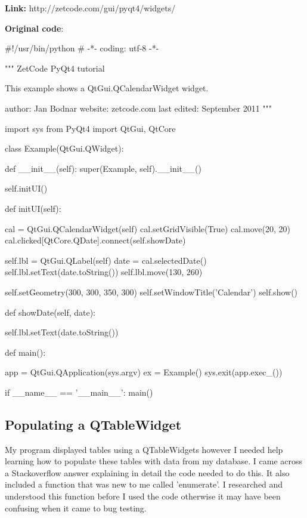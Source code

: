 \textbf{Link:} http://zetcode.com/gui/pyqt4/widgets/

\textbf{Original code}:

\begin{python}
#!/usr/bin/python
# -*- coding: utf-8 -*-

"""
ZetCode PyQt4 tutorial 

This example shows a QtGui.QCalendarWidget widget.

author: Jan Bodnar
website: zetcode.com 
last edited: September 2011
"""

import sys
from PyQt4 import QtGui, QtCore

class Example(QtGui.QWidget):
    
    def __init__(self):
        super(Example, self).__init__()
        
        self.initUI()
    
    
    def initUI(self):      

        cal = QtGui.QCalendarWidget(self)
        cal.setGridVisible(True)
        cal.move(20, 20)
        cal.clicked[QtCore.QDate].connect(self.showDate)
        
        self.lbl = QtGui.QLabel(self)
        date = cal.selectedDate()
        self.lbl.setText(date.toString())
        self.lbl.move(130, 260)
        
        self.setGeometry(300, 300, 350, 300)
        self.setWindowTitle('Calendar')
        self.show()
        
    def showDate(self, date):     
    
        self.lbl.setText(date.toString())
    
    
def main():
    
    app = QtGui.QApplication(sys.argv)
    ex = Example()
    sys.exit(app.exec_())


if __name__ == '__main__':
    main()
\end{python}

\subsection{Populating a QTableWidget}

My program displayed tables using a QTableWidgets however I needed help learning how to populate these tables with data from my database. I came across a Stackoverflow answer explaining in detail the code needed to do this. It also included a function that was new to me called 'enumerate'. I researched and understood this function before I used the code otherwise it may have been confusing when it came to bug testing.

